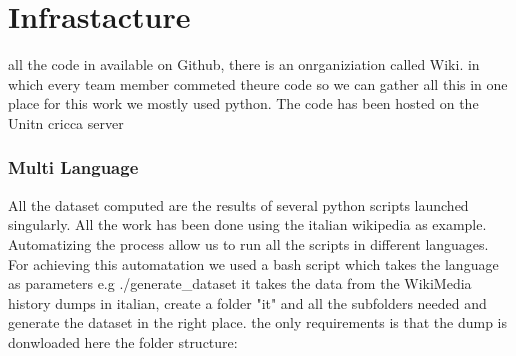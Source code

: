 \chapter{Infrastacture}
all the code in available on Github, there is an onrganiziation called Wiki. in which every team
member commeted theure code so we can gather all this in one place 
for this work we mostly used python. The code has been hosted on the Unitn cricca server 
\subsection{Multi Language}
All the dataset computed are the results of several python scripts launched singularly. All the work
has been done using the italian wikipedia as example. Automatizing the process allow us to run all
the scripts in different languages. For achieving this automatation we used a bash script which
takes the language as parameters e.g ./generate\_dataset it takes the data from the WikiMedia history
dumps in italian, create a folder "it" and all the subfolders needed and generate the dataset in the
right place. the only requirements is that the dump is donwloaded  here the folder structure:  

